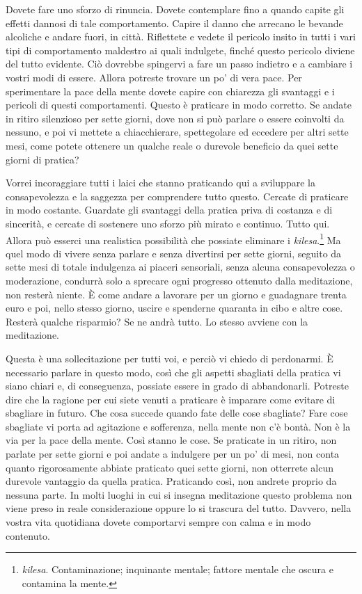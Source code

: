 Dovete fare uno sforzo di rinuncia. Dovete contemplare fino a quando
capite gli effetti dannosi di tale comportamento. Capire il danno che
arrecano le bevande alcoliche e andare fuori, in città. Riflettete e
vedete il pericolo insito in tutti i vari tipi di comportamento
maldestro ai quali indulgete, finché questo pericolo diviene del tutto
evidente. Ciò dovrebbe spingervi a fare un passo indietro e a cambiare i
vostri modi di essere. Allora potreste trovare un po' di vera pace. Per
sperimentare la pace della mente dovete capire con chiarezza gli
svantaggi e i pericoli di questi comportamenti. Questo è praticare in
modo corretto. Se andate in ritiro silenzioso per sette giorni, dove non
si può parlare o essere coinvolti da nessuno, e poi vi mettete a
chiacchierare, spettegolare ed eccedere per altri sette mesi, come
potete ottenere un qualche reale o durevole beneficio da quei sette
giorni di pratica?

Vorrei incoraggiare tutti i laici che stanno praticando qui a sviluppare
la consapevolezza e la saggezza per comprendere tutto questo. Cercate di
praticare in modo costante. Guardate gli svantaggi della pratica priva
di costanza e di sincerità, e cercate di sostenere uno sforzo più mirato
e continuo. Tutto qui. Allora può esserci una realistica possibilità che
possiate eliminare i \emph{kilesa}.\footnote{\emph{kilesa}.
  Contaminazione; inquinante mentale; fattore mentale che oscura e
  contamina la mente.} Ma quel modo di vivere senza parlare e senza
divertirsi per sette giorni, seguito da sette mesi di totale indulgenza
ai piaceri sensoriali, senza alcuna consapevolezza o moderazione,
condurrà solo a sprecare ogni progresso ottenuto dalla meditazione, non
resterà niente. È come andare a lavorare per un giorno e guadagnare
trenta euro e poi, nello stesso giorno, uscire e spenderne quaranta in
cibo e altre cose. Resterà qualche risparmio? Se ne andrà tutto. Lo
stesso avviene con la meditazione.

Questa è una sollecitazione per tutti voi, e perciò vi chiedo di
perdonarmi. È necessario parlare in questo modo, così che gli aspetti
sbagliati della pratica vi siano chiari e, di conseguenza, possiate
essere in grado di abbandonarli. Potreste dire che la ragione per cui
siete venuti a praticare è imparare come evitare di sbagliare in futuro.
Che cosa succede quando fate delle cose sbagliate? Fare cose sbagliate
vi porta ad agitazione e sofferenza, nella mente non c'è bontà. Non è la
via per la pace della mente. Così stanno le cose. Se praticate in un
ritiro, non parlate per sette giorni e poi andate a indulgere per un po'
di mesi, non conta quanto rigorosamente abbiate praticato quei sette
giorni, non otterrete alcun durevole vantaggio da quella pratica.
Praticando così, non andrete proprio da nessuna parte. In molti luoghi
in cui si insegna meditazione questo problema non viene preso in reale
considerazione oppure lo si trascura del tutto. Davvero, nella vostra
vita quotidiana dovete comportarvi sempre con calma e in modo contenuto.

